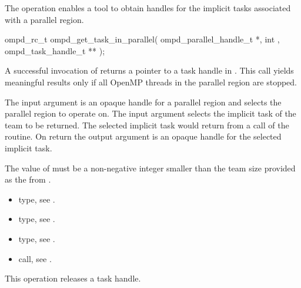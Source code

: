 \label{subsubsubsec:ompd_get_task_in_parallel}
\summary
The   operation enables a tool to obtain handles for
the implicit tasks associated with a parallel region.

\format

\begin{cspecific}
\begin{ompSyntax}
ompd_rc_t ompd_get_task_in_parallel(
  ompd_parallel_handle_t *,
  int ,
  ompd_task_handle_t **
);
\end{ompSyntax}
\end{cspecific}


\descr
A successful invocation of   returns a pointer to
a task handle in .
This call yields meaningful results only if all OpenMP threads in the parallel
region are stopped.

\argdesc
The input argument  is an opaque handle for a parallel region
and selects the parallel region to operate on.
The input argument  selects the implicit task of the team to be 
returned.
The selected implicit task would return  from a call of the 
 routine.
On return the output argument  is an opaque handle for the selected 
implicit task.

\restrictions
The value of  must be a non-negative integer smaller than the
team size provided as the  from .

\crossreferences
\begin{itemize}
	\item {} type, see .
	\item {} type, see 
	.
	\item {} type, see .
	\item {} call, see 
	.
\end{itemize}

\label{subsubsubsec:ompd_release_task_handle}
\summary
This operation releases a task handle.

\format

